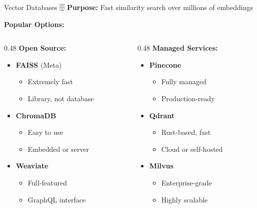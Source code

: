 \documentclass[aspectratio=169]{beamer}
\begin{document}
\begin{frame}[shrink=10]{Vector Databases 🗄️}
\textbf{Purpose:} Fast similarity search over millions of embeddings

\vspace{0.5em}

\textbf{Popular Options:}

\begin{columns}[T]
\begin{column}{0.48\textwidth}
\textbf{Open Source:}
\begin{itemize}\setlength{\itemsep}{0pt}
    \item \textbf{FAISS} (Meta)
    \begin{itemize}\setlength{\itemsep}{0pt}
        \item Extremely fast
        \item Library, not database
    \end{itemize}
    \item \textbf{ChromaDB}
    \begin{itemize}\setlength{\itemsep}{0pt}
        \item Easy to use
        \item Embedded or server
    \end{itemize}
    \item \textbf{Weaviate}
    \begin{itemize}\setlength{\itemsep}{0pt}
        \item Full-featured
        \item GraphQL interface
    \end{itemize}
\end{itemize}
\end{column}

\begin{column}{0.48\textwidth}
\textbf{Managed Services:}
\begin{itemize}\setlength{\itemsep}{0pt}
    \item \textbf{Pinecone}
    \begin{itemize}\setlength{\itemsep}{0pt}
        \item Fully managed
        \item Production-ready
    \end{itemize}
    \item \textbf{Qdrant}
    \begin{itemize}\setlength{\itemsep}{0pt}
        \item Rust-based, fast
        \item Cloud or self-hosted
    \end{itemize}
    \item \textbf{Milvus}
    \begin{itemize}\setlength{\itemsep}{0pt}
        \item Enterprise-grade
        \item Highly scalable
    \end{itemize}
\end{itemize}
\end{column}
\end{columns}


\end{frame}
\end{document}
